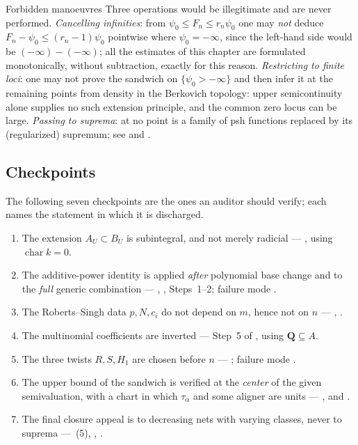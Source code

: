 \begin{warning}{Forbidden manoeuvres}
\label{warn:ch44-forbidden}
Three operations would be illegitimate and are never performed.
\emph{Cancelling infinities}: from $\psi_0\le F_n\le r_n\psi_0$ one may
\emph{not} deduce $F_n-\psi_0\le(r_n-1)\psi_0$ pointwise where
$\psi_0=-\infty$, since the left-hand side would be
$(-\infty)-(-\infty)$; all the estimates of this chapter are formulated
monotonically, without subtraction, exactly for this reason.
\emph{Restricting to finite loci}: one may not prove the sandwich on
$\{\psi_0>-\infty\}$ and then infer it at the remaining points from density
in the Berkovich topology: upper semicontinuity alone supplies no such
extension principle, and the common zero locus can be large.
\emph{Passing to suprema}: at no point is a family of psh functions
replaced by its (regularized) supremum; see
 and .
\end{warning}

\subsection{Checkpoints}
\label{sec:ch44-checkpoints}

The following seven checkpoints are the ones an auditor should verify; each
names the statement in which it is discharged.

\begin{enumerate}
\item The extension $A_U\subset B_U$ is subintegral, and not merely
      radicial --- , using
      $\operatorname{char}k=0$.
\item The additive-power identity is applied \emph{after} polynomial base
      change and to the \emph{full} generic combination ---
      ,
      , Steps~1--2;
      failure mode .
\item The Roberts--Singh data $p,N,c_i$ do not depend on $m$, hence not
      on $n$ --- ,
      .
\item The multinomial coefficients are inverted --- Step~5 of
      , using
      $\mathbf Q\subseteq A$.
\item The three twists $R,S,H_1$ are chosen before $n$ ---
      ; failure mode
      .
\item The upper bound of the sandwich is verified at the \emph{center} of
      the given semivaluation, with a chart in which $\tau_\alpha$ and
      some aligner are units --- , and
      .
\item The final closure appeal is to decreasing nets with varying classes,
      never to suprema --- \,(5),
      ,
      .
\end{enumerate}

